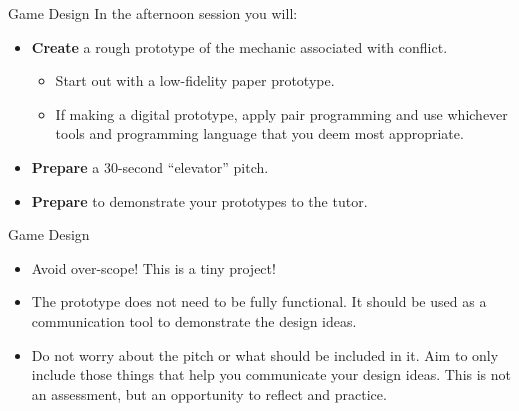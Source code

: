 \documentclass[xcolor={dvipsnames}]{beamer}\usepackage{etoolbox}\newtoggle{printable}\togglefalse{printable}
\begin{document}
\begin{frame}{Game Design}
	In the afternoon session you will:
	
	\begin{itemize}
		\item \textbf{Create} a rough prototype of the mechanic associated with conflict.
		\begin{itemize}
			\item Start out with a low-fidelity paper prototype.
			\item If making a digital prototype, apply pair programming and use whichever tools
			and programming language that you deem most appropriate.
		\end{itemize}
		\item \textbf{Prepare} a 30-second ``elevator'' pitch.
		\item \textbf{Prepare} to demonstrate your prototypes to the tutor.
	\end{itemize}
\end{frame}

\begin{frame}{Game Design}
	\begin{itemize}
		\item Avoid over-scope! This is a tiny project!
		\item The prototype does not need to be fully functional. It should be used as a communication tool to demonstrate the design ideas.
		\item Do not worry about the pitch or what should be included in it. Aim to only include those things that help you communicate 
		your design ideas. This is not an assessment, but an opportunity to reflect and practice.
	\end{itemize}
\end{frame}


%
\end{document}
